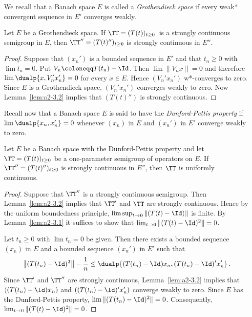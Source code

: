 We recall that a Banach space $E$ is called a \emph{Grothendieck space} if every weak* convergent sequence in $E'$ converges weakly.
\begin{theorem}\label{thm:a2-3.3}
Let $E$ be a Grothendieck space.
If  $\TT=(T(t))_{t \geq 0}$\, is a strongly continuous semigroup in $E$, then $\TT'' = (T(t)'')_{t \geq 0}$ is strongly continuous in $E''$.
\end{theorem}
\begin{proof}
Suppose that $(x_{n}')$ is a bounded sequence in $E'$ and that $t_{n} \geq 0$ with $\lim t_{n} = 0$.
Put $V_{n} \coloneqq T(t_{n}) - \Id$.
Then $\lim \|V_{n}x\| = 0$ and therefore $\lim \dualp{x, V_{n}'x_{n}'} = 0$ for every $x \in E$.
Hence $(V_{n}'x_{n}')$ w*-converges to zero.
Since $E$ is a Grothendieck space, $(V_{n}'x_{n}')$ converges weakly to zero.
Now Lemma~\ref{lem:a2-3.2} implies that $(T(t)'')$ is strongly continuous.
\end{proof}
Recall now that a Banach space $E$ is said to have the \emph{Dunford-Pettis property} if\/ $\lim \dualp{x_{n},x_{n}'} = 0$ whenever $(x_{n})$ in $E$ and $(x_{n}')$ in $E'$ converge weakly to zero.
\begin{theorem}\label{thm:a2-3.4}
Let $E$ be a Banach space with the Dunford-Pettis property and let  $\TT = (T(t))_{t \geq 0}$ be a one-parameter semigroup of operators on $E$.
If  $\TT'' = (T(t)'')_{t \geq 0}$ is strongly continuous in $E''$, then $\TT$ is uniformly continuous.
\end{theorem}
\begin{proof}
Suppose that $\TT''$ is a strongly continuous semigroup.
Then Lemma~\ref{lem:a2-3.2}   implies that $\TT'$ and $\TT$ are strongly continuous.
Hence by the uniform boundedness principle, $\lim \sup_{t \to 0} \|(T(t) - \Id)\|$ is finite.
By Lemma~\ref{lem:a2-3.1}   it suffices to show that $\lim_{t \to 0} \|(T(t) - \Id)^2\| = 0$.

Let $t_{n} \geq 0$ with $\lim t_{n} = 0$ be given.
Then there exists a bounded sequence $(x_{n})$ in $E$ and a bounded sequence $(x_{n}')$ in $E'$ such that
\[
\left\|(T(t_{n}) - \Id)^2 \right\| - \frac{1}{n} \leq \dualp{(T(t_{n}) - \Id)x_{n}, (T(t_{n}) - \Id)'x_{n}'}\,.
\]
Since $\TT'$ and $\TT''$ are strongly continuous, Lemma~\ref{lem:a2-3.2}   implies that $((T(t_{n}) - \Id)x_{n})$ and $((T(t_{n}) - \Id)'x_{n}')$ converge weakly to zero.
Since $E$ has the Dunford-Pettis property, $\lim \|(T(t_{n}) - \Id)^2\| = 0$.
Consequently, $\lim_{t \to 0} \|(T(t) - \Id)^2\| = 0$.
\end{proof}
